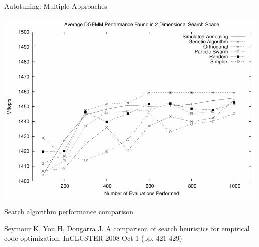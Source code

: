 \documentclass[10pt, compress, aspectratio=169, xcolor={table,usenames,dvipsnames}]{beamer}
\begin{document}
\begin{frame}[label={sec:org7c7b849}]{Autotuning: Multiple Approaches}
\begin{center}
\begin{center}
\includegraphics[width=.58\linewidth]{../../img/seymour2008comparison_algorithms.pdf}
\end{center}

\vspace{-.2cm}

Search algorithm \alert{performance} comparison

\scriptsize{Seymour K, You H, Dongarra J. A comparison of search heuristics for empirical code optimization. InCLUSTER 2008 Oct 1 (pp. 421-429)}
\end{center}
\end{frame}
\end{document}
